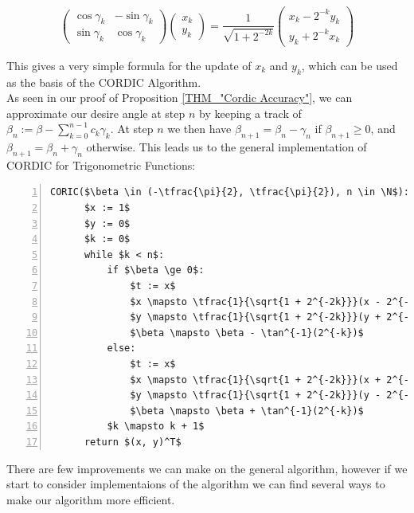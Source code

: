 {\begin{displaymath}
	\left(\begin{array}{cc}
		\cos\gamma_k & - \sin\gamma_k\\
		\sin\gamma_k & \cos\gamma_k
	\end{array}\right)
	\left(\begin{array}{c}
		x_k \\ y_k
	\end{array}\right)
	= \frac{1}{\sqrt{1 + 2^{-2k}}}
	\left(\begin{array}{c}
		x_k - 2^{-k}y_k\\
		y_k + 2^{-k}x_k
	\end{array}\right)
\end{displaymath}

This gives a very simple formula for the update of \(x_k\) and \(y_k\), which can be used as the basis of the CORDIC Algorithm.\\

As seen in our proof of Proposition \ref{THM_"Cordic Accuracy"}, we can approximate our desire angle at step \(n\) by keeping a track of \(\beta_n := \beta - \sum_{k=0}^{n-1}c_k\gamma_k\). At step \(n\) we then have \(\beta_{n+1} = \beta_n - \gamma_n\) if \(\beta_{n+1} \ge 0\), and \(\beta_{n+1} = \beta_n + \gamma_n\) otherwise. This leads us to the general implementation of CORDIC for Trigonometric Functions:

\begin{lstlisting}[numbers=left,frame=single,mathescape,caption={General Cordic},label={PCD_"General_Cordic"}]
  CORIC($\beta \in (-\tfrac{\pi}{2}, \tfrac{\pi}{2}), n \in \N$):
      $x := 1$
      $y := 0$
      $k := 0$
      while $k < n$:
          if $\beta \ge 0$:
              $t := x$
              $x \mapsto \tfrac{1}{\sqrt{1 + 2^{-2k}}}(x - 2^{-k}y)$
              $y \mapsto \tfrac{1}{\sqrt{1 + 2^{-2k}}}(y + 2^{-k}t)$
              $\beta \mapsto \beta - \tan^{-1}(2^{-k})$
          else:
              $t := x$
              $x \mapsto \tfrac{1}{\sqrt{1 + 2^{-2k}}}(x + 2^{-k}y)$
              $y \mapsto \tfrac{1}{\sqrt{1 + 2^{-2k}}}(y - 2^{-k}t)$
              $\beta \mapsto \beta + \tan^{-1}(2^{-k})$
          $k \mapsto k + 1$
      return $(x, y)^T$
\end{lstlisting}

There are few improvements we can make on the general algorithm, however if we start to consider implementaions of the algorithm we can find several ways to make our algorithm more efficient.\\

}

